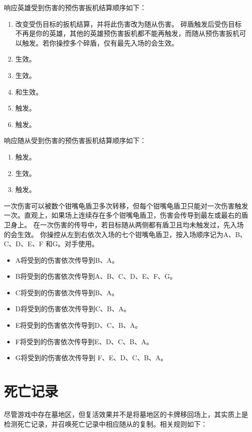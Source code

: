 响应英雄受到伤害的预伤害扳机结算顺序如下：
\begin{enumerate}
    \item 改变受伤目标的扳机结算，并将此伤害改为随从伤害。
        \notice 碎盾触发后受伤目标不再是你的英雄，其他的英雄预伤害扳机都不能再触发，而随从预伤害扳机可以触发。若你操控多个碎盾，仅有最先入场的会生效。
    \item {}生效。
    \item {}生效。
    \item {}和生效。
    \item {}触发。
    \item {}触发。
\end{enumerate}

响应随从受到伤害的预伤害扳机结算顺序如下：
\begin{enumerate}
    \item {}触发。
    \item {}生效。
    \item {}触发。
\end{enumerate}

一次伤害可以被数个钳嘴龟盾卫多次转移，但每个钳嘴龟盾卫只能对一次伤害触发一次。直观上，如果场上连续存在多个钳嘴龟盾卫，伤害会传导到最左或最右的盾卫身上。
\notice 在一次伤害的传导中，若目标随从两侧都有盾卫且均未触发过，先入场的会生效。
\example 你操控从左到右依次入场的七个钳嘴龟盾卫，按入场顺序记为A、B、C、D、E、F 和G。对手使用。
\begin{itemize}
    \item A将受到的伤害依次传导到B、A。
    \item B将受到的伤害依次传导到A、B、C、D、E、F、G。
    \item C将受到的伤害依次传导到B、A。
    \item D将受到的伤害依次传导到C、B、A。
    \item E将受到的伤害依次传导到D、C、B、A。
    \item F将受到的伤害依次传导到E、D、C、B、A。
    \item G将受到的伤害依次传导到 F、E、D、C、B、A。
\end{itemize}

\section{死亡记录}

尽管游戏中存在墓地区，但复活效果并不是将墓地区的卡牌移回场上，其实质上是检测死亡记录，并召唤死亡记录中相应随从的复制。相关规则如下：

